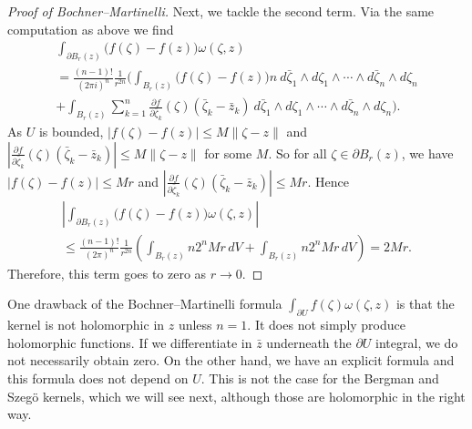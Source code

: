 \documentclass[12pt,openany]{book}
\newcommand{\snorm}[1]{\lVert {#1} \rVert}
\newcommand{\abs}[1]{\left\lvert {#1} \right\rvert}
\theoremstyle{plain}
\theoremstyle{remark}
\theoremstyle{definition}
\theoremstyle{exercise}
\theoremstyle{example}
\begin{document}
\begin{proof}[Proof of Bochner--Martinelli]
Next, we tackle the second term.
Via the same computation as above we find
\begin{multline*}
\int_{\partial B_r(z)}
\bigl(f(\zeta)-f(z)\bigr)
\omega(\zeta,z)
\\
=
\frac{(n-1)!}{{(2\pi i)}^n}\frac{1}{r^{2n}}
\Biggl(
\int_{B_r(z)}
\bigl(f(\zeta)-f(z)\bigr)
n~
d\bar{\zeta}_1 \wedge d\zeta_1 \wedge
\cdots \wedge
d\bar{\zeta}_n \wedge d\zeta_n
\\
+
\int_{B_r(z)}
\sum_{k=1}^n
\frac{\partial f}{\partial \bar{\zeta}_k}(\zeta)
(\bar{\zeta}_k-\bar{z}_k)
~
d\bar{\zeta}_1 \wedge d\zeta_1 \wedge
\cdots \wedge
d\bar{\zeta}_n \wedge d\zeta_n \Biggr).
\end{multline*}
As $U$ is bounded, $\abs{f(\zeta)-f(z)} \leq M
\snorm{\zeta-z}$
and
$\abs{\frac{\partial f}{\partial \bar{\zeta}_k}(\zeta)
(\bar{\zeta}_k-\bar{z}_k)} \leq M \snorm{\zeta-z}$ for some $M$.
So for all $\zeta \in \partial B_r(z)$,
we have
$\abs{f(\zeta)-f(z)} \leq Mr$
and $\abs{\frac{\partial f}{\partial \bar{\zeta}_k}(\zeta)
(\bar{\zeta}_k-\bar{z}_k)} \leq Mr$.
Hence
\begin{multline*}
\abs{
\int_{\partial B_r(z)}
\bigl(f(\zeta)-f(z)\bigr)
\omega(\zeta,z)
}
\\
\leq
\frac{(n-1)!}{{(2\pi)}^n}\frac{1}{r^{2n}}
\left(
\int_{B_r(z)}
n 2^n Mr \, dV
+
\int_{B_r(z)}
n 2^n Mr \, dV
\right)
=
2 M r .
\end{multline*}
Therefore, this term goes to zero as $r \to 0$.
\end{proof}

One drawback of the Bochner--Martinelli formula $\int_{\partial U} f(\zeta)
\omega(\zeta,z)$ is that the kernel is not
holomorphic in $z$ unless $n=1$.  It does not simply produce
holomorphic functions.  If we differentiate in $\bar{z}$ underneath the
$\partial U$ integral, we do not necessarily obtain zero.
On the other hand, we have an explicit formula and this formula does not
depend on $U$.  This is not the case for the Bergman and Szeg\"o
kernels, which we will see next, although those are holomorphic in the
right way.
\end{document}
